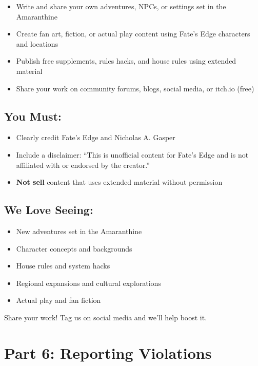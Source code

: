 \documentclass[11pt]{article}
\begin{document}
\begin{itemize}[leftmargin=*, itemsep=2pt]
  \item Write and share your own adventures, NPCs, or settings set in the Amaranthine
  \item Create fan art, fiction, or actual play content using Fate's Edge characters and locations
  \item Publish free supplements, rules hacks, and house rules using extended material
  \item Share your work on community forums, blogs, social media, or itch.io (free)
\end{itemize}

\subsection*{You Must:}

\begin{itemize}[leftmargin=*, itemsep=2pt]
  \item Clearly credit Fate's Edge and Nicholas A. Gasper
  \item Include a disclaimer: ``This is unofficial content for Fate's Edge and is not affiliated with or endorsed by the creator.''
  \item \textbf{Not sell} content that uses extended material without permission
\end{itemize}

\subsection*{We Love Seeing:}

\begin{itemize}[leftmargin=*, itemsep=2pt]
  \item New adventures set in the Amaranthine
  \item Character concepts and backgrounds
  \item House rules and system hacks
  \item Regional expansions and cultural explorations
  \item Actual play and fan fiction
\end{itemize}

Share your work! Tag us on social media and we'll help boost it.

\section*{Part 6: Reporting Violations}
\end{document}
